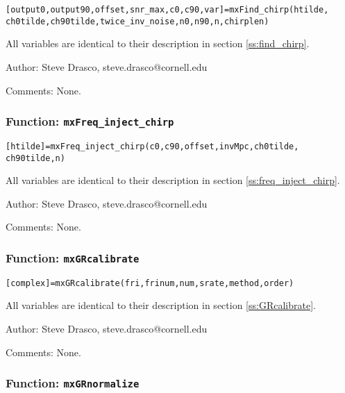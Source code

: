 \texttt{[output0,output90,offset,snr\_max,c0,c90,var]=mxFind\_chirp(htilde,} \\
\texttt{ch0tilde,ch90tilde,twice\_inv\_noise,n0,n90,n,chirplen)}

All variables are identical to their description in section \ref{ss:find_chirp}.

\begin{description}
\item{Author:} Steve Drasco, steve.drasco@cornell.edu
\item{Comments:} None.
\end{description}

\subsubsection{Function: {\tt mxFreq\_inject\_chirp}}
\label{sss:mxFreq_inject_chirp}

\texttt{[htilde]=mxFreq\_inject\_chirp(c0,c90,offset,invMpc,ch0tilde,}
\texttt{ch90tilde,n)}

All variables are identical to their description in section \ref{ss:freq_inject_chirp}.

\begin{description}
\item{Author:} Steve Drasco, steve.drasco@cornell.edu
\item{Comments:} None.
\end{description}

\subsubsection{Function: {\tt mxGRcalibrate}}
\label{sss:mxGRcalibrate}

\texttt{[complex]=mxGRcalibrate(fri,frinum,num,srate,method,order)}

All variables are identical to their description in section \ref{ss:GRcalibrate}.

\begin{description}
\item{Author:} Steve Drasco, steve.drasco@cornell.edu
\item{Comments:} None.
\end{description}

\subsubsection{Function: {\tt mxGRnormalize}}
\label{sss:mxGRnormalize}

